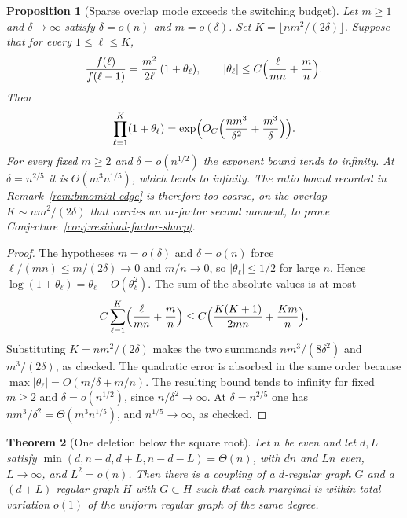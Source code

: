 \documentclass[11pt]{article}
\newtheorem{theorem}{Theorem}
\newtheorem{proposition}[theorem]{Proposition}
\begin{document}
\begin{proposition}[Sparse overlap mode exceeds the switching budget]
\label{prop:switching-sparse-mode}
Let \(m\ge 1\) and \(\delta\to\infty\) satisfy \(\delta=o(n)\) and \(m=o(\delta)\).
Set \(K=\lfloor nm^2/(2\delta)\rfloor\). Suppose that for every \(1\le\ell\le K\),
\[
\frac{f(\ell)}{f(\ell-1)}
=
\frac{m^2}{2\ell}\,(1+\theta_\ell),
\qquad
|\theta_\ell|
\le
C\Bigl(\frac{\ell}{mn}+\frac{m}{n}\Bigr).
\]
Then
\[
\prod_{\ell=1}^{K}(1+\theta_\ell)
=
\exp\Bigl(O_C\Bigl(\frac{nm^3}{\delta^2}+\frac{m^3}{\delta}\Bigr)\Bigr).
\]
For every fixed \(m\ge 2\) and \(\delta=o(n^{1/2})\) the exponent bound tends to
infinity. At \(\delta=n^{2/5}\) it is \(\Theta(m^3 n^{1/5})\), which tends to
infinity. The ratio bound recorded in Remark~\ref{rem:binomial-edge} is
therefore too coarse, on the overlap \(K\sim nm^2/(2\delta)\) that carries an
\(m\)-factor second moment, to prove
Conjecture~\ref{conj:residual-factor-sharp}.
\end{proposition}

\begin{proof}
The hypotheses \(m=o(\delta)\) and \(\delta=o(n)\) force
\(\ell/(mn)\le m/(2\delta)\to 0\) and \(m/n\to 0\), so \(|\theta_\ell|\le 1/2\)
for large \(n\). Hence \(\log(1+\theta_\ell)=\theta_\ell+O(\theta_\ell^2)\).
The sum of the absolute values is at most
\[
C\sum_{\ell=1}^{K}\Bigl(\frac{\ell}{mn}+\frac{m}{n}\Bigr)
\le
C\Bigl(\frac{K(K+1)}{2mn}+\frac{Km}{n}\Bigr).
\]
Substituting \(K=nm^2/(2\delta)\) makes the two summands
\(nm^3/(8\delta^2)\) and \(m^3/(2\delta)\), as checked.
The quadratic error is absorbed in the same order because
\(\max|\theta_\ell|=O(m/\delta+m/n)\).
The resulting bound tends to infinity for fixed \(m\ge 2\) and
\(\delta=o(n^{1/2})\), since \(n/\delta^2\to\infty\).
At \(\delta=n^{2/5}\) one has \(nm^3/\delta^2=\Theta(m^3 n^{1/5})\), and
\(n^{1/5}\to\infty\), as checked.
\end{proof}

\begin{theorem}[One deletion below the square root]
\label{thm:deletion-below-sqrt}
Let \(n\) be even and let \(d,L\) satisfy
\(\min(d,n-d,d+L,n-d-L)=\Theta(n)\), with \(dn\) and \(Ln\) even,
\(L\to\infty\), and \(L^2=o(n)\).
Then there is a coupling of a \(d\)-regular graph \(G\) and a
\((d+L)\)-regular graph \(H\) with \(G\subset H\) such that each marginal is
within total variation \(o(1)\) of the uniform regular graph of the same degree.
\end{theorem}
\end{document}
